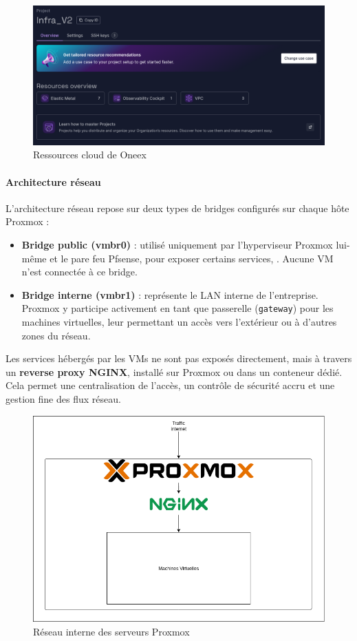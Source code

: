 \begin{figure} [H]
	\centering
	\includegraphics[width=.5\textwidth]{figures/Ressources cloud.png}
	\caption{Ressources cloud de Oneex}
\end{figure}

\paragraph{Architecture réseau}

L’architecture réseau repose sur deux types de bridges configurés sur chaque hôte Proxmox :

\begin{itemize}
	\item \textbf{Bridge public (vmbr0)} : utilisé uniquement par l’hyperviseur Proxmox lui-même et le pare feu Pfsense, pour exposer certains services, . Aucune VM n’est connectée à ce bridge.
	\item \textbf{Bridge interne (vmbr1)} : représente le LAN interne de l’entreprise. Proxmox y participe activement en tant que passerelle (\texttt{gateway}) pour les machines virtuelles, leur permettant un accès vers l’extérieur ou à d’autres zones du réseau.
\end{itemize}

Les services hébergés par les VMs ne sont pas exposés directement, mais à travers un \textbf{reverse proxy NGINX}, installé sur Proxmox ou dans un conteneur dédié. Cela permet une centralisation de l’accès, un contrôle de sécurité accru et une gestion fine des flux réseau.

\begin{figure} [H]
	\centering
	\includegraphics[width=.5\textwidth]{figures/Reseau inter proxmox.png}
	\caption{Réseau interne des serveurs Proxmox}
\end{figure}

